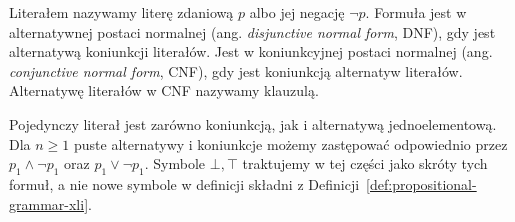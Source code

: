 \begin{definicja}
\label{def:lst-dnf-cnf}
Literałem nazywamy literę zdaniową $p$ albo jej negację $\neg p$.
Formuła jest w alternatywnej postaci normalnej
(ang. \emph{disjunctive normal form}, DNF), gdy jest
alternatywą koniunkcji literałów. Jest w koniunkcyjnej
postaci normalnej (ang. \emph{conjunctive normal form}, CNF),
gdy jest koniunkcją alternatyw literałów.
Alternatywę literałów w CNF nazywamy klauzulą.
\end{definicja}
Pojedynczy literał jest zarówno koniunkcją, jak i alternatywą
jednoelementową. Dla $n\geq1$ puste alternatywy i koniunkcje
możemy zastępować odpowiednio przez $p_1\land\neg p_1$
oraz $p_1\lor\neg p_1$. Symbole $\bot,\top$ traktujemy
w tej części jako skróty tych formuł, a nie nowe symbole
w definicji składni z
Definicji~\ref{def:propositional-grammar-xli}.

